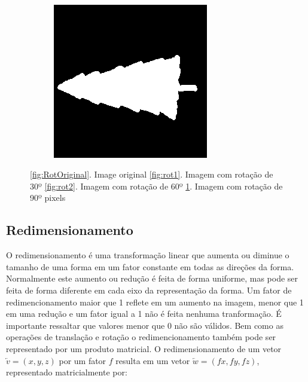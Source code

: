 \documentclass[
	article,			%
	11pt,				%
	oneside,			%
	a4paper,			%
	english,			%
	brazil,				%
	sumario=tradicional
	]{abntex2}
\begin{document}
\begin{figure}
\begin{subfigure}[b]{0.3\textwidth}
        \end{subfigure}
        ~
        \begin{subfigure}[b]{0.3\textwidth}
                \includegraphics[width=\textwidth]{imagens/ex1/image90.png}
                \caption{}
                \label{fig:rot3}       
        \end{subfigure}
        \caption{ \ref{fig:RotOriginal}. Image original
        \ref{fig:rot1}. Imagem com rotação de 30º
        \ref{fig:rot2}. Imagem com rotação de 60º
        \ref{fig:rot3}. Imagem com rotação de 90º
        pixels}
        \label{fig:rotacao}
\end{figure}


\subsection{Redimensionamento}
O redimensionamento é uma transformação linear que aumenta ou diminue o tamanho
de uma forma em um fator constante em todas as direções da forma. Normalmente
este aumento ou redução é feita de forma uniforme, mas pode ser feita de forma
diferente em cada eixo da representação da forma. Um fator de redimencionamento
maior que 1 reflete em um aumento na imagem, menor que 1 em uma redução e um
fator igual a 1 não é feita nenhuma tranformação. É importante ressaltar que
valores menor que 0 não são válidos.
Bem como as operações de translação e rotação o redimencionamento também pode
ser representado por um produto matricial. O redimensionamento de um vetor
$\overleftarrow{v}=(x,y,z)$ por um fator $f$ resulta em um vetor
$\overleftarrow{w}=(fx,fy,fz)$, representado matricialmente por:
\end{document}
